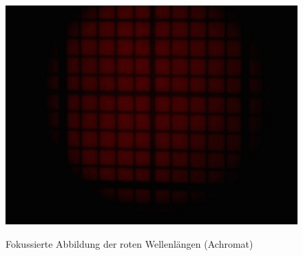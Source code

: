\begin{figure}[htb]
\begin{minipage}[t]{0.32\textwidth}
		\includegraphics[clip=true, trim=700px 950px 900px 250px, width=\linewidth]{img/ChromAbb/Prakt_Linsenfehler_2015_06_04_073}
		\label{fig:cm_rot_achromat}
		\caption{Fokussierte Abbildung der roten Wellenlängen (Achromat)}
	\end{minipage}
\end{figure}


